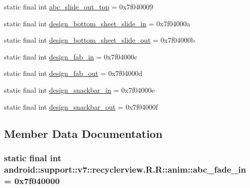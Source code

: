\begin{CompactItemize}
\item 
static final int \hyperlink{classandroid_1_1support_1_1v7_1_1recyclerview_1_1_r_1_1anim_b9713058d4d55dc80e5c38cd3c867d34}{abc\_\-slide\_\-out\_\-top} = 0x7f040009
\item 
static final int \hyperlink{classandroid_1_1support_1_1v7_1_1recyclerview_1_1_r_1_1anim_e3e3b1f220396b769c4640e077e1a363}{design\_\-bottom\_\-sheet\_\-slide\_\-in} = 0x7f04000a
\item 
static final int \hyperlink{classandroid_1_1support_1_1v7_1_1recyclerview_1_1_r_1_1anim_9c37035389abadedec9c13e7daca5755}{design\_\-bottom\_\-sheet\_\-slide\_\-out} = 0x7f04000b
\item 
static final int \hyperlink{classandroid_1_1support_1_1v7_1_1recyclerview_1_1_r_1_1anim_d8370c367a5cd660f3fa046013bdc2a7}{design\_\-fab\_\-in} = 0x7f04000c
\item 
static final int \hyperlink{classandroid_1_1support_1_1v7_1_1recyclerview_1_1_r_1_1anim_54e899f8204ab6845659503a62a164ba}{design\_\-fab\_\-out} = 0x7f04000d
\item 
static final int \hyperlink{classandroid_1_1support_1_1v7_1_1recyclerview_1_1_r_1_1anim_9c5ed7bd3c8dc741994a8259c291d3d1}{design\_\-snackbar\_\-in} = 0x7f04000e
\item 
static final int \hyperlink{classandroid_1_1support_1_1v7_1_1recyclerview_1_1_r_1_1anim_7d6c9c7b2556257d3e23d75b0a296d82}{design\_\-snackbar\_\-out} = 0x7f04000f
\end{CompactItemize}


\subsection{Member Data Documentation}
\hypertarget{classandroid_1_1support_1_1v7_1_1recyclerview_1_1_r_1_1anim_56b3ebf55e3eab4b66db01a7f3094d6f}{
\subsubsection[{abc\_\-fade\_\-in}]{\setlength{\rightskip}{0pt plus 5cm}static final int android::support::v7::recyclerview.R.R::anim::abc\_\-fade\_\-in = 0x7f040000}}
\label{classandroid_1_1support_1_1v7_1_1recyclerview_1_1_r_1_1anim_56b3ebf55e3eab4b66db01a7f3094d6f}


